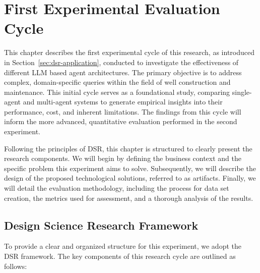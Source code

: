\chapter{First Experimental Evaluation Cycle} \label{chap:first_experiment}

    This chapter describes the first experimental cycle of this research, as introduced in Section~\ref{sec:dsr-application}, conducted to investigate the effectiveness of different LLM based agent architectures. The primary objective is to address complex, domain-specific queries within the field of well construction and maintenance. This initial cycle serves as a foundational study, comparing single-agent and multi-agent systems to generate empirical insights into their performance, cost, and inherent limitations. The findings from this cycle will inform the more advanced, quantitative evaluation performed in the second experiment.

    Following the principles of DSR, this chapter is structured to clearly present the research components. We will begin by defining the business context and the specific problem this experiment aims to solve. Subsequently, we will describe the design of the proposed technological solutions, referred to as artifacts. Finally, we will detail the evaluation methodology, including the process for data set creation, the metrics used for assessment, and a thorough analysis of the results.
    
    \section{Design Science Research Framework}
    
        To provide a clear and organized structure for this experiment, we adopt the DSR framework. The key components of this research cycle are outlined as follows:

